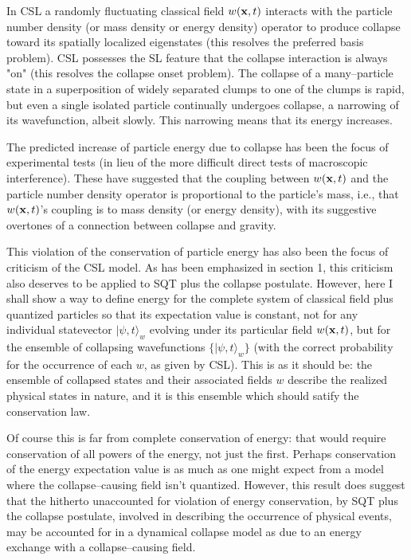 \documentclass{article}
\begin{document}
	In CSL a randomly fluctuating classical field $w({\bf x},t)$ interacts with the 
particle number density (or mass density or energy density) operator 
to produce collapse toward its spatially localized eigenstates (this resolves the 
preferred basis problem).  CSL possesses the SL feature that the collapse 
interaction is always "on" (this resolves the collapse onset problem). The collapse 
of a many--particle state in a superposition of widely separated clumps to one of 
the clumps is rapid, but even a single isolated particle continually undergoes collapse, 
a narrowing of its wavefunction, albeit slowly.  This narrowing means that its 
energy increases.  

	The predicted increase of particle energy due to collapse has been the 
focus of experimental tests\cite{PearleSquires1,Collett,Ring} (in lieu 
of the more difficult direct tests of macroscopic 
interference\cite{PearleZ,Leggett,Clauser}).  These have suggested that 
the coupling between $w({\bf x},t)$ and the particle number density 
operator is proportional to the particle's mass, i.e., that $w({\bf x},t)$'s coupling is to mass density 
(or energy density), with its suggestive overtones of a connection 
between collapse and gravity\cite{Karolyhazy,Penrose,Diosi,GGR,PearleSquires2}.

	This violation of the conservation of particle energy has also been the
focus of criticism of the CSL model\cite{Ballentine, Anandan}. 
As has been emphasized in section 1, this criticism also deserves to 
be applied to SQT plus the collapse postulate.  However, here 
I shall show a way to define energy for the complete system of classical field plus quantized particles 
so that its expectation value is constant, not for 
any individual statevector $|\psi,t\rangle_w$ 
evolving under its particular field $w({\bf x},t)$, but  
for the ensemble of collapsing wavefunctions $\{ |\psi,t\rangle_w\}$ (with the correct 
probability for the occurrence of each $w$, as given by CSL).  This 
is as it should be: the ensemble of collapsed states and their associated fields  
$w$ describe the realized physical states in nature, 
and it is this ensemble which should satify the conservation law.
   
	Of course this is far from complete conservation of energy: that 
would require conservation of all powers of the energy, not just the first.  Perhaps 
conservation of the energy expectation value is as much as one might expect 
from a model where the collapse--causing field isn't quantized.  However, 
this result does suggest that the hitherto unaccounted for 
violation of energy conservation, by SQT plus the collapse postulate,  
involved in describing the occurrence of physical events,  
may be accounted for in a dynamical collapse model as due to 
an energy exchange with a collapse--causing field.
  
\end{document}
